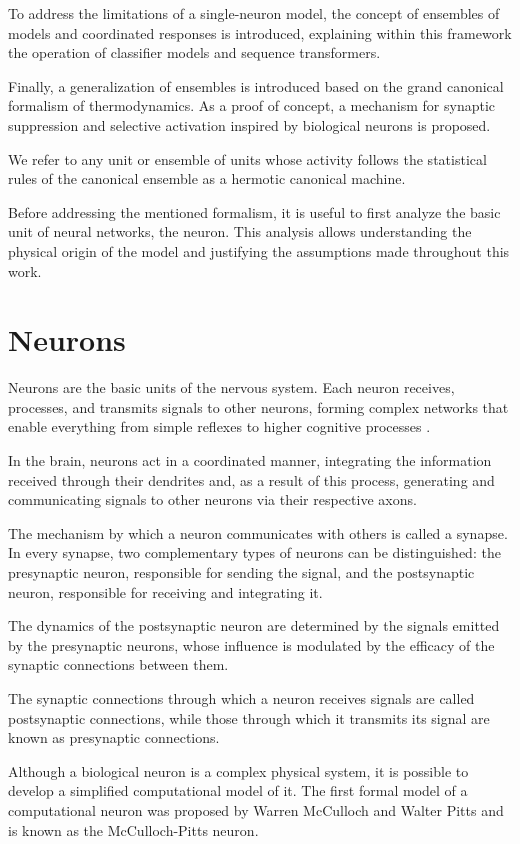 \documentclass[12pt]{article}
\begin{document}
To address the limitations of a single-neuron model, the concept of ensembles of models and coordinated responses is introduced, explaining within this framework the operation of classifier models and sequence transformers.

Finally, a generalization of ensembles is introduced based on the grand canonical formalism of thermodynamics. As a proof of concept, a mechanism for synaptic suppression and selective activation inspired by biological neurons is proposed.

We refer to any unit or ensemble of units whose activity follows the statistical rules of the canonical ensemble as a hermotic canonical machine.

Before addressing the mentioned formalism, it is useful to first analyze the basic unit of neural networks, the neuron. This analysis allows understanding the physical origin of the model and justifying the assumptions made throughout this work.
\section*{Neurons}

Neurons are the basic units of the nervous system. Each neuron receives, processes, and transmits signals to other neurons, forming complex networks that enable everything from simple reflexes to higher cognitive processes \cite{dayan2001theoretical}.

In the brain, neurons act in a coordinated manner, integrating the information received through their dendrites and, as a result of this process, generating and communicating signals to other neurons via their respective axons.

The mechanism by which a neuron communicates with others is called a synapse. In every synapse, two complementary types of neurons can be distinguished: the presynaptic neuron, responsible for sending the signal, and the postsynaptic neuron, responsible for receiving and integrating it.

The dynamics of the postsynaptic neuron are determined by the signals emitted by the presynaptic neurons, whose influence is modulated by the efficacy of the synaptic connections between them.

The synaptic connections through which a neuron receives signals are called postsynaptic connections, while those through which it transmits its signal are known as presynaptic connections.

Although a biological neuron is a complex physical system, it is possible to develop a simplified computational model of it. The first formal model of a computational neuron was proposed by Warren McCulloch and Walter Pitts \cite{mcculloch1943logical} and is known as the McCulloch-Pitts neuron.
\end{document}
